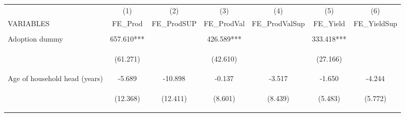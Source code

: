 \begin{center}
\begin{tabular}{lcccccc} \hline
 & (1) & (2) & (3) & (4) & (5) & (6) \\
VARIABLES & FE\_Prod & FE\_ProdSUP & FE\_ProdVal & FE\_ProdValSup & FE\_Yield & FE\_YieldSup \\ \hline
\vspace{4pt} & \begin{footnotesize}\end{footnotesize} & \begin{footnotesize}\end{footnotesize} & \begin{footnotesize}\end{footnotesize} & \begin{footnotesize}\end{footnotesize} & \begin{footnotesize}\end{footnotesize} & \begin{footnotesize}\end{footnotesize} \\
Adoption dummy & 657.610*** &  & 426.589*** &  & 333.418*** &  \\
\vspace{4pt} & \begin{footnotesize}(61.271)\end{footnotesize} & \begin{footnotesize}\end{footnotesize} & \begin{footnotesize}(42.610)\end{footnotesize} & \begin{footnotesize}\end{footnotesize} & \begin{footnotesize}(27.166)\end{footnotesize} & \begin{footnotesize}\end{footnotesize} \\
Age of household head (years) & -5.689 & -10.898 & -0.137 & -3.517 & -1.650 & -4.244 \\
\vspace{4pt} & \begin{footnotesize}(12.368)\end{footnotesize} & \begin{footnotesize}(12.411)\end{footnotesize} & \begin{footnotesize}(8.601)\end{footnotesize} & \begin{footnotesize}(8.439)\end{footnotesize} & \begin{footnotesize}(5.483)\end{footnotesize} & \begin{footnotesize}(5.772)\end{footnotesize} \\

\end{tabular}
\end{center}
